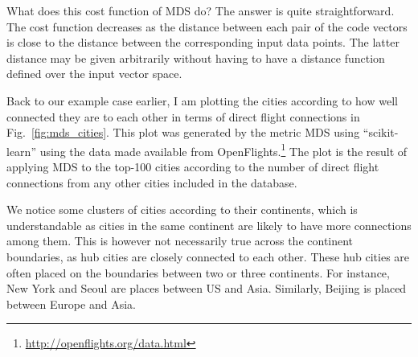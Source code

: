 \documentclass{report}
\begin{document}
What does this cost function of MDS do? The answer is quite straightforward. The
cost function decreases as the distance between each pair of the code vectors is
close to the distance between the corresponding input data points. The latter
distance may be given arbitrarily without having to have a distance function
defined over the input vector space. 

Back to our example case earlier, I am plotting the cities according to how well
connected they are to each other in terms of direct flight connections in
Fig.~\ref{fig:mds_cities}. This plot was generated by the metric MDS using
``scikit-learn'' using the data made available from OpenFlights.\footnote{
    \url{http://openflights.org/data.html}
} 
The plot is the result of applying MDS to the top-100 cities according to the
number of direct flight connections from any other cities included in the
database. 

We notice some clusters of cities according to their continents, which is
understandable as cities in the same continent are likely to have more
connections among them. This is however not necessarily true across the
continent boundaries, as hub cities are closely connected to each other. These
hub cities are often placed on the boundaries between two or three continents.
For instance, New York and Seoul are places between US and Asia. Similarly,
Beijing is placed between Europe and Asia. 
\end{document}
